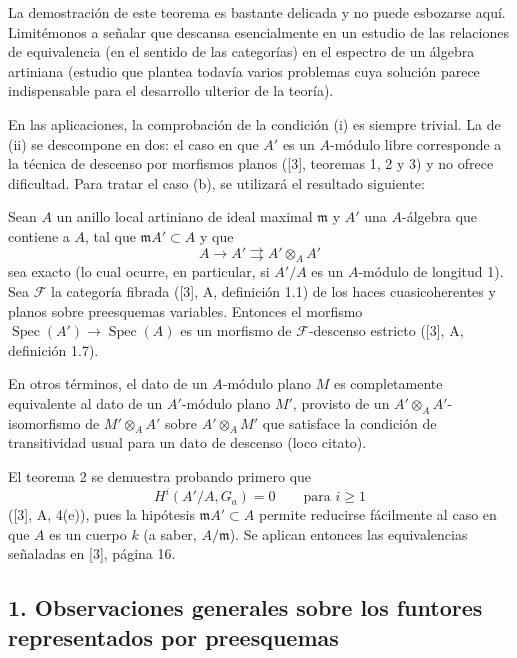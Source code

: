 La demostración de este teorema es bastante delicada y no puede esbozarse aquí.
Limitémonos a señalar que descansa esencialmente en un estudio de las relaciones
de equivalencia (en el sentido de las categorías) en el espectro de un álgebra
artiniana (estudio que plantea todavía varios problemas cuya solución parece
indispensable para el desarrollo ulterior de la teoría).

En las aplicaciones, la comprobación de la condición (i) es siempre trivial.
La de (ii) se descompone en dos: el caso en que $A'$ es un $A$-módulo libre
corresponde a la técnica de descenso por morfismos planos ([3], teoremas 1, 2 y
3) y no ofrece dificultad. Para tratar el caso (b), se utilizará el resultado
siguiente:

 Sean $A$ un anillo local artiniano de ideal maximal
$\mathfrak m$ y $A'$ una $A$-álgebra que contiene a $A$, tal que
$\mathfrak mA'\subset A$ y que
\[
  A\longrightarrow A'\rightrightarrows A'\otimes_A A'
\]
sea exacto (lo cual ocurre, en particular, si $A'/A$ es un $A$-módulo de
longitud 1). Sea $\mathcal F$ la categoría fibrada ([3], A, definición 1.1) de
los haces cuasicoherentes y planos sobre preesquemas variables. Entonces el
morfismo $\operatorname{Spec}(A')\longrightarrow\operatorname{Spec}(A)$ es un
morfismo de $\mathcal F$-descenso estricto ([3], A, definición 1.7).

En otros términos, el dato de un $A$-módulo plano $M$ es completamente
equivalente al dato de un $A'$-módulo plano $M'$, provisto de un
$A'\otimes_AA'$-isomorfismo de $M'\otimes_AA'$ sobre $A'\otimes_AM'$ que
satisface la condición de transitividad usual para un dato de descenso (loco
citato).

El teorema 2 se demuestra probando primero que
\[
  H^i(A'/A,G_a)=0\qquad\text{para }i\geq 1
\]
([3], A, 4(e)), pues la hipótesis $\mathfrak mA'\subset A$ permite reducirse
fácilmente al caso en que $A$ es un cuerpo $k$ (a saber, $A/\mathfrak m$). Se
aplican entonces las equivalencias señaladas en [3], página 16.


\subsection*{1. Observaciones generales sobre los funtores representados por preesquemas}

